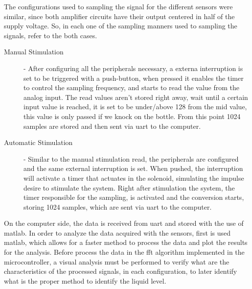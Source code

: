 The configurations used to sampling the signal for the different sensors were similar, since both amplifier circuits have their output centered in half of the supply voltage. So, in each one of the sampling manners used to sampling the signals, refer to the both cases. 

 
\begin{description}
    \item[Manual Stimulation]{- After configuring all the peripherals necessary, a externa interruption is set to be triggered with a push-button, when pressed it enables the timer to control the sampling frequency, and starts to read the value from the analog input. The read values aren't stored right away, wait until a certain input value is reached, it is set to be under/above 128 from the mid value, this value is only passed if we knock on the bottle. From this point 1024 samples are stored and then sent via \acrshort{uart} to the computer.}
      
    \item[Automatic Stimulation]{- Similar to the manual stimulation read, the peripherals are configured and the same external interruption is set. When pushed, the interruption will activate a timer that actuates in the solenoid, simulating the impulse desire to stimulate the system. Right after stimulation the system, the timer responsible for the sampling, is activated and the conversion starts, storing 1024 samples, which are sent via \acrshort{uart} to the computer.} 

\end{description}
On the computer side, the data is received from \acrshort{uart} and stored with the use of \acrshort{matlab}. In order to analyze the data acquired with the sensors, first is used \acrshort{matlab}, which allows for a faster method to process the data and plot the results for the analysis. Before process the data in the \acrshort{fft} algorithm implemented in the microcontroller, a visual analysis must be performed to verify what are the characteristics of the processed signals, in each configuration, to later identify what is the proper method to identify the liquid level.  
